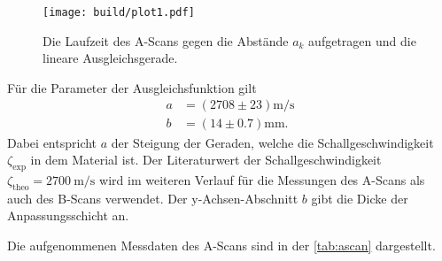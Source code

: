 \begin{figure}[H]
	\texttt{[image: build/plot1.pdf]}
	\captionsetup{width=0.765\linewidth}
	\caption{Die Laufzeit des A-Scans gegen die Abstände $a_k$ aufgetragen und die lineare Ausgleichsgerade.}
	\label{fig:plot1}
\end{figure}

Für die Parameter der Ausgleichsfunktion gilt
\begin{align*}
    a &= \left(2708 \pm 23\right) \si{\meter \per \second}\\
    b &= \left(14 \pm 0.7\right) \si{\milli\meter}.
\end{align*}
Dabei entspricht $a$ der Steigung der Geraden, welche die Schallgeschwindigkeit $\zeta_{\text{exp}}$ in dem Material ist.
Der Literaturwert der Schallgeschwindigkeit $\zeta_{\text{theo}} = \SI{2700}{\meter\per\second}$ \cite{doppler} wird im weiteren Verlauf für die 
Messungen des A-Scans als auch des B-Scans verwendet.
Der y-Achsen-Abschnitt $b$ gibt die Dicke der Anpassungsschicht an. 

Die aufgenommenen Messdaten des A-Scans sind in der \autoref{tab:ascan} dargestellt.
\begin{table}[H]
    \centering
    \caption{Messwerte des A-Scan.}
	
    \label{tab:ascan}
\end{table}

